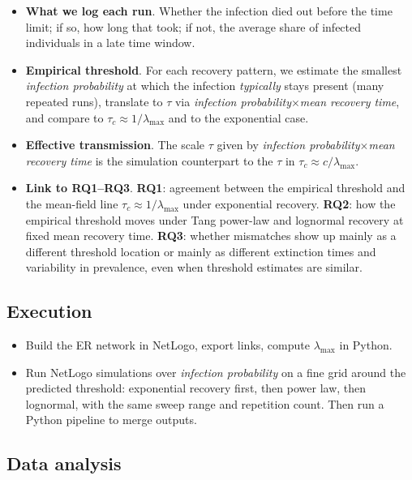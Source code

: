 \documentclass[11pt,a4paper]{article}
\begin{document}
\begin{itemize}[leftmargin=*]
  \item \textbf{What we log each run}. Whether the infection died out before the time limit; if so, how long that took; if not, the average share of infected individuals in a late time window.

  \item \textbf{Empirical threshold}. For each recovery pattern, we estimate the smallest \emph{infection probability} at which the infection \emph{typically} stays present (many repeated runs), translate to $\tau$ via \emph{infection probability}$\times$\emph{mean recovery time}, and compare to $\tau_c \approx 1/\lambda_{\max}$ and to the exponential case.

  \item \textbf{Effective transmission}. The scale $\tau$ given by \emph{infection probability}$\times$\emph{mean recovery time} is the simulation counterpart to the $\tau$ in $\tau_c \approx c/\lambda_{\max}$.

  \item \textbf{Link to RQ1--RQ3}. \textbf{RQ1}: agreement between the empirical threshold and the mean-field line $\tau_c \approx 1/\lambda_{\max}$ under exponential recovery. \textbf{RQ2}: how the empirical threshold moves under Tang power-law and lognormal recovery at fixed mean recovery time. \textbf{RQ3}: whether mismatches show up mainly as a different threshold location or mainly as different extinction times and variability in prevalence, even when threshold estimates are similar.
\end{itemize}

\subsection*{Execution}

\begin{itemize}[leftmargin=*]
  \item Build the ER network in NetLogo, export links, compute $\lambda_{\max}$ in Python.
  \item Run NetLogo simulations over \emph{infection probability} on a fine grid around the predicted threshold: exponential recovery first, then power law, then lognormal, with the same sweep range and repetition count. Then run a Python pipeline to merge outputs.
\end{itemize}

\subsection*{Data analysis}
\end{document}
